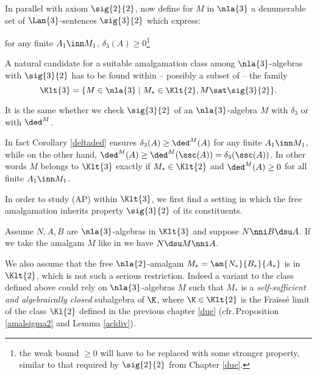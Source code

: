 
\bigskip
In parallel with axiom $\sig{2}{2}$, now define
for $M$ in $\nla{3}$ a denumerable set of $\Lan{3}$-sentences $\sig{3}{2}$ which express:
\begin{itemize}
for any finite $A_{1}\inn M_{1}$, $\delta_{3}(A)\geq0$\footnote{the weak bound $\geq0$
will have to be replaced with some stronger property, similar to that required by $\sig{2}{2}$ from Chapter \ref{due}.}
\end{itemize}

A natural candidate for a suitable amalgamation class among $\nla{3}$-algebras with $\sig{3}{2}$
has to be found within -- possibly a subset of -- the family
$$\Klt{3}=\{M\in\nla{3}\mid M_{*}\in\Klt{2},M\sat\sig{3}{2}\}.$$

\begin{rem}\label{finalrem}
It is the same whether we check $\sig{3}{2}$ of an $\nla{3}$-algebra $M$ with
$\delta_{3}$ or with $\ded^{M}$.

In fact Corollary \ref{deltaded} ensures $\delta_{3}(A)\geq\ded^{M}(A)$ for any finite $A_{1}\inn M_{1}$,
while on the other hand, $\ded^{M}(A)\geq\ded^{M}(\ssc(A))=\delta_{3}(\ssc(A))$. In other words
$M$ belongs to $\Klt{3}$ exactly if $M_{*}\in\Klt{2}$ and $\ded^{M}(A)\geq0$ for all finite $A_{1}\inn M_{1}$.
\end{rem}

\medskip
In order to study (AP) within $\Klt{3}$, we first find a setting in which the free amalgamation  inherits
property $\sig{3}{2}$ of its constituents.

Assume $N,A,B$ are $\nla{3}$-algebras in $\Klt{3}$ and suppose $N\nni B\dsu A$.
If we take the amalgam $M$ like in  we have $N\dsu M \nni A$.

We also assume that the free $\nla{2}$-amalgam $M_{*}=\am{N_{*}}{B_{*}}{A_{*}}$ is in $\Klt{2}$, which
is not such a serious restriction. Indeed a variant to the class defined above could rely on  $\nla{3}$-algebras $M$
such that $M_{*}$ is a {\em self-sufficient and algebraically closed} subalgebra of $\K$, where $\K\in\Klt{2}$ is the Fra\"iss\'e limit of
the class $\Kl{2}$ defined in the previous chapter \ref{due} (cfr.\,Proposition \ref{amalsigma2} and Lemma \ref{acldiv}).

